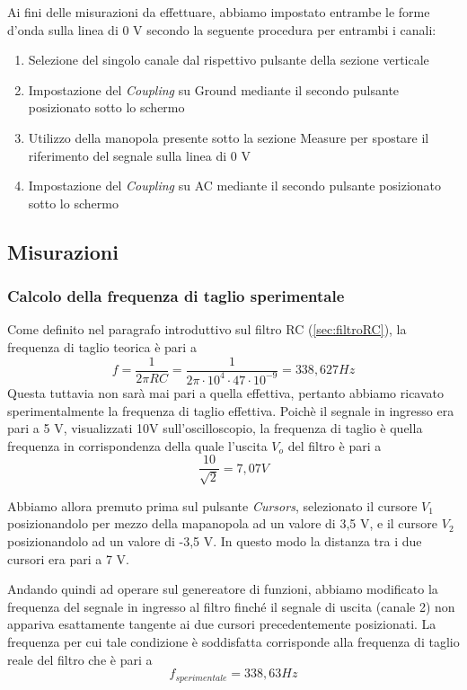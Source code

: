 \begin{itemize}
    Ai fini delle misurazioni da effettuare, abbiamo impostato entrambe le forme d'onda sulla linea di 0 V secondo la seguente procedura per entrambi i canali:
    \begin{enumerate}
        \item Selezione del singolo canale dal rispettivo pulsante della sezione verticale
        \item Impostazione del \emph{Coupling} su Ground mediante il secondo pulsante posizionato sotto lo schermo
        \item Utilizzo della manopola presente sotto la sezione Measure per spostare il riferimento del segnale sulla linea di 0 V
        \item Impostazione del \emph{Coupling} su AC mediante il secondo pulsante posizionato sotto lo schermo  
    \end{enumerate}
\end{itemize}

\clearpage


\subsection{Misurazioni}

\subsubsection{Calcolo della frequenza di taglio sperimentale}

Come definito nel paragrafo introduttivo sul filtro RC (\ref{sec:filtroRC}), la frequenza di taglio teorica è pari a
\[f=\frac{1}{2\pi RC}= \frac{1}{2\pi \cdot10^4 \cdot 47 \cdot10^{-9}} = 338,627 Hz\]
Questa tuttavia non sarà mai pari a quella effettiva, pertanto abbiamo ricavato sperimentalmente la frequenza di taglio effettiva. Poichè il segnale in ingresso era pari a 5 V, visualizzati 10V sull'oscilloscopio, la frequenza di taglio è quella frequenza in corrispondenza della quale l'uscita $V_{o}$ del filtro è pari a 
\[\frac{10}{\sqrt{2}} = 7,07 V\]

Abbiamo allora premuto prima sul pulsante \emph{Cursors}, selezionato il cursore $V_1$ posizionandolo per mezzo della mapanopola ad un valore di 3,5 V, 
e il cursore $V_2$ posizionandolo ad un valore di -3,5 V. In questo modo la distanza tra i due cursori era pari a 7 V.

Andando quindi ad operare sul genereatore di funzioni, abbiamo modificato la frequenza del segnale in ingresso al filtro finché il segnale di uscita (canale 2) non appariva esattamente tangente ai due cursori precedentemente posizionati.
La frequenza per cui tale condizione è soddisfatta corrisponde alla frequenza di taglio reale del filtro che è pari a 
\[f_{sperimentale} = 338,63Hz\]

